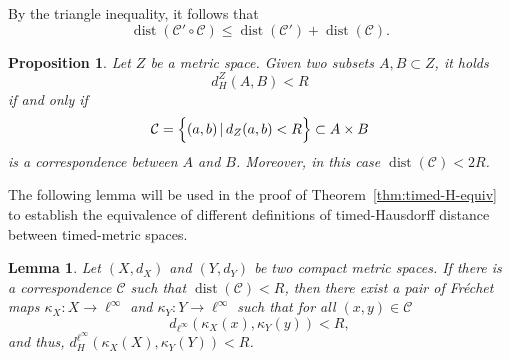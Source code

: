 \documentclass[a4paper,12pt,reqno]{amsart}
\theoremstyle{plain}
\newtheorem{lem}[thm]{Lemma}
\newtheorem{prop}[thm]{Proposition}
\newcommand{\be}{\begin{equation}}
\newcommand{\ee}{\end{equation}}
\newcommand{\dist}{\operatorname{dist}}
\begin{document}
By the triangle inequality, it follows that 
\be\label{eq:dis of composition}
\dist(\mathcal{C}'\circ \mathcal{C}) \leq \dist(\mathcal{C}') + \dist(\mathcal{C}).
\ee


\begin{prop}\label{prop:Hausdorff}
Let $Z$ be a metric space. 
Given two subsets $A,B\subset Z$, it holds
\[
d_H^Z(A,B)<R
\]
if and only if
\[
\mathcal{C}=\Bigl\{(a,b) \,|\, d_Z(a,b)<R \Bigr\}
\subset A\times B
\]
is a correspondence between $A$ and $B$. Moreover, in this case $\dist(\mathcal C) < 2R$.
\end{prop}


The following lemma will be used in the proof of Theorem~\ref{thm:timed-H-equiv} to establish the equivalence of different definitions of timed-Hausdorff distance between timed-metric spaces.

\begin{lem} \label{lem:corr-K}
Let $(X, d_X)$ and $(Y, d_Y)$ be two compact metric spaces.
If there is a correspondence $\mathcal C$ such that $\dist(\mathcal C) < R$, then there exist a pair of
Fr\'echet maps
$\kappa_X:X \to \ell^\infty$
and
$\kappa_Y:Y \to \ell^\infty$
such that for all $(x,y) \in \mathcal C$
\be \label{eq:corr-K}
d_{\ell^\infty}(\kappa_X(x),\kappa_Y(y))<R, 
\ee
and thus, $d_H^{\ell^\infty}(\kappa_X(X),\kappa_Y(Y))<R$.
\end{lem}
\end{document}
